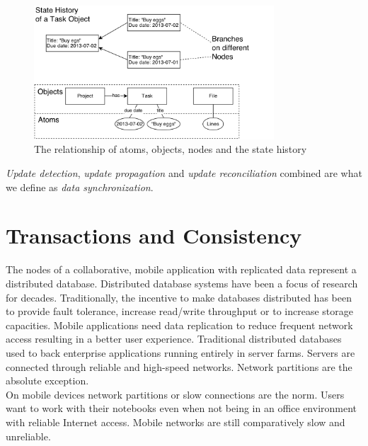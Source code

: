 \begin{figure}[definitions]
  \centering
  \includegraphics[width=0.8\textwidth]{img/definitions}
  \caption{The relationship of atoms, objects, nodes and the state history}
  \label{fig:background.definition.terms}
\end{figure}

\emph{Update detection}, \emph{update propagation} and \emph{update reconciliation} combined are what we define as \emph{data synchronization}.

\section{Transactions and Consistency}
\label{sec:background.transactions}
The nodes of a collaborative, mobile application with replicated data represent a distributed database.
Distributed database systems have been a focus of research for decades.
Traditionally, the incentive to make databases distributed has been to provide fault tolerance, increase read/write throughput or to increase storage capacities.
Mobile applications need data replication to reduce frequent network access resulting in a better user experience.
Traditional distributed databases used to back enterprise applications running entirely in server farms.
Servers are connected through reliable and high-speed networks.
Network partitions are the absolute exception.\\
On mobile devices network partitions or slow connections are the norm.
Users want to work with their notebooks even when not being in an office environment with reliable Internet access.
Mobile networks are still comparatively slow and unreliable.\\

